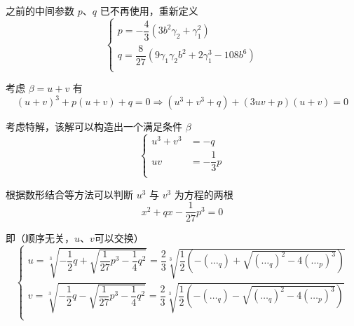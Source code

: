\documentclass[UTF8]{ctexart}
\begin{document}
				之前的中间参数 $p$、$q$ 已不再使用，重新定义
				\begin{equation}
					\begin{cases}
						p = - \dfrac{4}{3}  \left(3 b^{2} \gamma_{2} + \gamma_{1}^{2}\right)                         \\
						q =   \dfrac{8}{27} \left(9\gamma_{1} \gamma_{2} b^{2} + 2 \gamma_{1}^{3} - 108 b^{6}\right) \\
					\end{cases}
				\end{equation}

				考虑 $\beta = u + v$ 有
				\begin{equation}
					(u + v)^{3} + p (u + v) + q = 0
					\Longrightarrow
					(u^3 + v^3 + q) + (3 uv + p) (u + v) = 0
				\end{equation}

				考虑特解，该解可以构造出一个满足条件 $\beta$
				\begin{equation}
					\begin{cases}
						u^3 + v^3 & = - q \\
						uv        & = -\dfrac{1}{3} p \\
					\end{cases}
				\end{equation}
				
				根据数形结合等方法可以判断 $u^3$ 与 $v^3$ 为方程的两根
				\begin{equation}
					x^2 + q x - \dfrac{1}{27} p^3 = 0
				\end{equation}


				即（顺序无关，$u$、$v$可以交换）
				\begin{equation}
					\begin{cases}
						u = \sqrt[3]{- \dfrac{1}{2} q + \sqrt{\dfrac{1}{27} p^3 - \dfrac{1}{4} q^2}} = \dfrac{2}{3} \sqrt[3]{\dfrac{1}{2}\left(-(\dots_q) + \sqrt{(\dots_q)^2 - 4 (\dots_p)^3}\right)} \\
						v = \sqrt[3]{- \dfrac{1}{2} q - \sqrt{\dfrac{1}{27} p^3 - \dfrac{1}{4} q^2}} = \dfrac{2}{3} \sqrt[3]{\dfrac{1}{2}\left(-(\dots_q) - \sqrt{(\dots_q)^2 - 4 (\dots_p)^3}\right)} \\
					\end{cases}
					\label{eq: uv solve}
				\end{equation}
\end{document}
